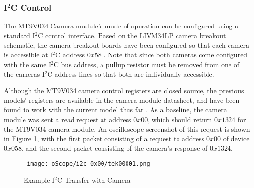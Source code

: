 \subsubsection{I$^2$C Control} 
The MT9V034 Camera module's mode of operation can be configured using a standard I$^2$C control interface. Based on the LIVM34LP camera breakout schematic, the camera breakout boards have been configured so that each camera is accessible at I$^2$C address $0x58$ \cite{livm34lp}. Note that since both cameras come configured with the same I$^2$C bus address, a pullup resistor must be removed from one of the cameras I$^2$C address lines so that both are individually accessible.
\par
Although the MT9V034 camera control registers are closed source, the previous models' registers are available in the camera module datasheet, and have been found to work with the current model thus far \cite{mt9v032}. As a baseline, the camera module was sent a read request at address $0x00$, which should return $0x1324$ for the MT9V034 camera module. An oscilloscope screenshot of this request is shown in Figure \ref{camVersion}, with the first packet consisting of a request to address $0x00$ of device $0x058$, and the second packet consisting of the camera's response of $0x1324$. 
\begin{figure}[H]
	\centerline{\texttt{[image: oScope/i2c\_0x00/tek00001.png]}}
	\caption{Example I$^2$C Transfer with Camera}
	\label{camVersion}
\end{figure}

